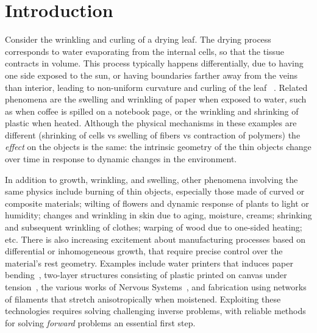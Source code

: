 \documentclass[timestamp,acmtog]{acmart}
\begin{document}
\section{Introduction}
Consider the wrinkling and curling of a drying leaf. The drying process corresponds to water evaporating from the internal cells, so that the tissue contracts in volume. This process typically happens differentially, due to having one side exposed to the sun, or having boundaries farther away from the veins than interior, leading to non-uniform curvature and curling of the leaf ~\cite{Xiao2011, Jeong2013}. Related phenomena are the swelling and wrinkling of paper when exposed to water, such as when coffee is spilled on a notebook page, or the wrinkling and shrinking of plastic when heated. Although the physical mechanisms in these examples are different (shrinking of cells vs swelling of fibers vs contraction of polymers) the \emph{effect} on the objects is the same: the intrinsic geometry of the thin objects change over time in response to dynamic changes in the environment. 

In addition to growth, wrinkling, and swelling, other phenomena involving the same physics include burning of thin objects, especially those made of curved or composite materials; wilting of flowers and dynamic response of plants to light or humidity; changes and wrinkling in skin due to aging, moisture, creams; shrinking and subsequent wrinkling of clothes; warping of wood due to one-sided heating; etc. There is also increasing excitement about manufacturing processes based on differential or inhomogeneous growth, that require precise control over the material's rest geometry. Examples include water printers that induces paper bending~\cite{Guberan2012}, two-layer structures consisting of plastic printed on canvas under tension~\cite{Perez2017}, the various works of Nervous Systems~\cite{NervousSystems}, and fabrication using networks of filaments that stretch anisotropically when moistened. Exploiting these technologies requires solving challenging inverse problems, with reliable methods for solving \emph{forward} problems an essential first step. 
\end{document}
